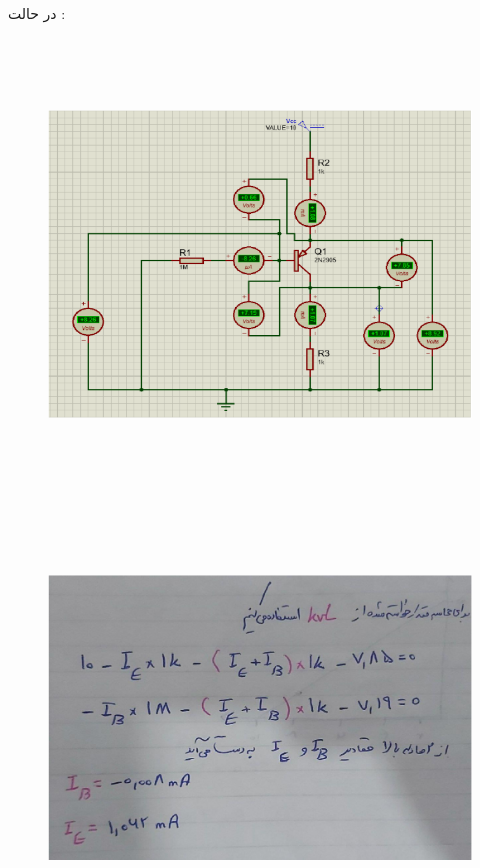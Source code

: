 \documentclass[12pt]{article}
\begin{document}
\clearpage
در حالت :
\begin{figure}[H]
	\begin{center}
		\includegraphics[width=\textwidth, height=12cm]{./images/9.4}
	\end{center}
\end{figure}

\begin{figure}[H]
	\begin{center}
		\includegraphics[width=\textwidth, height=11cm]{./images/9.4.1}
	\end{center}
\end{figure}
\end{document}
